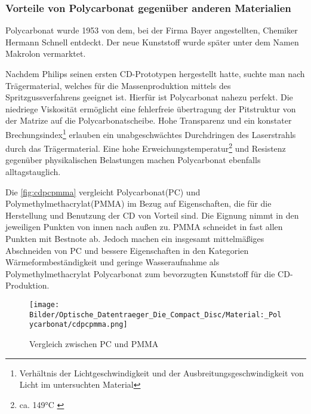 \subsubsection{Vorteile von Polycarbonat gegenüber anderen Materialien}

Polycarbonat wurde 1953 von dem, bei der Firma Bayer angestellten, Chemiker
Hermann Schnell entdeckt. Der neue Kunststoff wurde später unter dem Namen
Makrolon\textsuperscript{\textregistered} vermarktet. \cite{cuzpc}

Nachdem Philips seinen ersten CD-Prototypen hergestellt hatte, suchte man nach
Trägermaterial, welches für die Massenproduktion mittels des
Spritzgussverfahrens geeignet ist. Hierfür ist Polycarbonat nahezu perfekt. Die
niedriege Viskosität ermöglicht eine fehlerfreie übertragung der Pitstruktur von
der Matrize auf die Polycarbonatscheibe. Hohe Transparenz und ein konstater
Brechungsindex\footnote{Verhältnis der Lichtgeschwindigkeit und der
Ausbreitungsgeschwindigkeit von Licht im untersuchten Material} erlauben ein
unabgeschwächtes Durchdringen des Laserstrahls durch das Trägermaterial. Eine
hohe Erweichungstemperatur\footnote{ca. 149°C \cite{cuzpc2}} und Resistenz
gegenüber physikalischen Belastungen machen Polycarbonat ebenfalls
alltagstauglich. \cite{cfcd}

Die \autoref{fig:cdpcpmma} vergleicht Polycarbonat(PC) und
Polymethylmethacrylat(PMMA) im Bezug auf Eigenschaften, die für die Herstellung
und Benutzung der CD von Vorteil sind. Die Eignung nimmt in den jeweiligen
Punkten von innen nach außen zu. PMMA schneidet in fast allen Punkten mit
Bestnote ab. Jedoch machen ein insgesamt mittelmäßiges Abschneiden von PC und
bessere Eigenschaften in den Kategorien Wärmeformbeständigkeit und geringe
Wasseraufnahme als Polymethylmethacrylat Polycarbonat zum bevorzugten Kunststoff
für die CD-Produktion.

\begin{figure}[h]
  \begin{center}
      \begin{minipage}[t]{\textwidth}
        \begin{center}
            \texttt{[image: Bilder/Optische\_Datentraeger\_Die\_Compact\_Disc/Material:\_Polycarbonat/cdpcpmma.png]}
            \caption[Vergleich zwischen PC und PMMA \newline Roth, Klaus: CD, DVD \& Co.: Die Chemie der schillernden Scheiben, in: Chemie in unserer Zeit (41/2007), S. 337]{Vergleich zwischen PC und PMMA}
            \label{fig:cdpcpmma}
        \end{center}
      \end{minipage}
  \end{center}
\end{figure}
